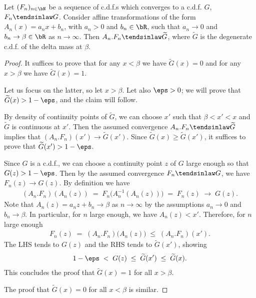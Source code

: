 \begin{lemma}
  \label{lem:degenerate-shrinking-limit}
  \leanok
  Let $(F_n)_{n \in \bN}$ be a sequence of c.d.f.s which converges to a c.d.f. $G$,
  $F_n \tendsinlaw G$. Consider affine transformations of the form $A_n(x) = a_n x + b_n$,
  with $a_n > 0$ and $b_n \in \bR$, such that $a_n \to 0$ and $b_n \to \beta \in \bR$
  as $n \to \infty$. Then $A_n . F_n \tendsinlaw \widetilde{G}$, where
  $\widetilde{G}$ is the degenerate c.d.f. of the delta mass at $\beta$.
\end{lemma}
\begin{proof}
  It suffices to prove that for any $x < \beta$ we have $\widetilde{G}(x) = 0$
  and for any $x > \beta$ we have $\widetilde{G}(x) = 1$.

  Let us focus on the latter, so let $x > \beta$. Let also $\eps > 0$; we will prove
  that $\widetilde{G}(x) > 1 - \eps$, and the claim will follow.

  By density of continuity points of $\widetilde{G}$, we can choose $x'$ such that
  $\beta < x' < x$ and $\widetilde{G}$ is continuous at $x'$. Then the assumed
  convergence $A_n . F_n \tendsinlaw \widetilde{G}$ implies that
  $(A_n . F_n)(x') \to \widetilde{G}(x')$. Since $\widetilde{G}(x) \ge \widetilde{G}(x')$,
  it suffices to prove that $\widetilde{G}(x') > 1 - \eps$.

  Since $G$ is a c.d.f., we can choose a continuity point $z$ of $G$
  large enough so that $G(z) > 1 - \eps$.
  Then by the assumed convergence $F_n \tendsinlaw G$, we have
  $F_n(z) \to G(z)$. By definition we have
  \begin{align*}
    (A_n . F_n)(A_n(z)) \; = \; F_n \big( A_n^{-1} (A_n(z)) \big) \; = \; F_n(z)
      \; \longrightarrow \; G(z) . %
  \end{align*}
  Note that $A_n(z) = a_n z + b_n \to \beta$ as $n \to \infty$ by the assumptions
  $a_n \to 0$ and $b_n \to \beta$. In particular, for $n$ large enough,
  we have $A_n(z) < x'$.
  Therefore, for $n$ large enough
  \begin{align*}
    F_n(z) \; = \; (A_n . F_n) \big( A_n(z) \big) \; \le \; (A_n . F_n)(x') .
  \end{align*}
  The LHS tends to $G(z)$ and the RHS tends to $\widetilde{G}(x')$,
  showing
  \begin{align*}
    1 - \eps \; < \; G(z) \; \le \; \widetilde{G}(x') \; \le \; \widetilde{G}(x) .
  \end{align*}
  This concludes the proof that $\widetilde{G}(x) = 1$ for all $x > \beta$.

  The proof that $\widetilde{G}(x) = 0$ for all $x < \beta$ is similar.
\end{proof}

